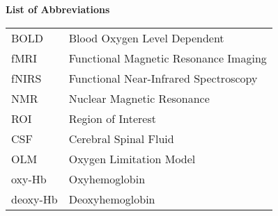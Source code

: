 \begin{center}
  {\normalsize\bfseries List of Abbreviations}
\end{center}
\vspace{\cftafterloftitleskip}
\begin{table*}[h]
    \setlength{\extrarowheight}{10pt}
    \begin{tabular*}{\linewidth}{l l}
      BOLD     & Blood Oxygen Level Dependent           \\
      fMRI     & Functional Magnetic Resonance Imaging  \\
      fNIRS    & Functional Near-Infrared Spectroscopy  \\
      NMR      & Nuclear Magnetic Resonance             \\
      ROI      & Region of Interest                     \\
      CSF      & Cerebral Spinal Fluid                  \\
      OLM      & Oxygen Limitation Model                \\
      oxy-Hb   & Oxyhemoglobin                          \\
      deoxy-Hb & Deoxyhemoglobin                        \\

\end{tabular*}
\end{table*}
